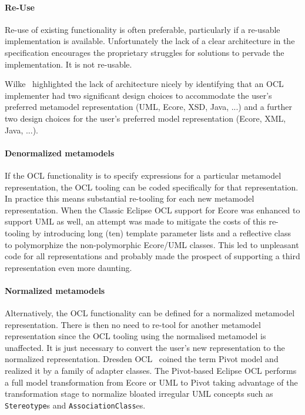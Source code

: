 \documentclass{jot}
\begin{document}
\paragraph{Re-Use} Re-use of existing functionality is often preferable, particularly if a re-usable implementation is available. Unfortunately the lack of a clear architecture in the specification encourages the proprietary struggles for solutions to pervade the implementation. It is not re-usable.

Wilke~\cite{Wilke-Variability} highlighted the lack of architecture nicely by identifying that an OCL implementer had two significant design choices to accommodate the user's preferred metamodel representation (UML, Ecore, XSD, Java, ...) and a further two design choices for the user's preferred model representation (Ecore, XML, Java, ...).

\paragraph{Denormalized metamodels} If the OCL functionality is to specify expressions for a particular metamodel representation, the OCL tooling can be coded specifically for that representation. In practice this means substantial re-tooling for each new metamodel representation. When the Classic Eclipse OCL support for Ecore was enhanced to support UML as well, an attempt was made to mitigate the costs of this re-tooling by introducing long (ten) template parameter lists and a reflective class to polymorphize the non-polymorphic Ecore/UML classes. This led to unpleasant code for all representations and probably made the prospect of supporting a third representation even more daunting.

\paragraph{Normalized metamodels} Alternatively, the OCL functionality can be defined for a normalized metamodel representation. There is then no need to re-tool for another metamodel representation since the OCL tooling using the normalised metamodel is unaffected. It is just necessary to convert the user's new representation to the normalized representation. Dresden OCL~\cite{Dresden-OCL} coined the term Pivot model and realized it by a family of adapter classes. The Pivot-based Eclipse OCL performs a full model transformation from Ecore or UML to Pivot taking advantage of the transformation stage to normalize bloated irregular UML concepts such as \verb$Stereotype$s and \verb$AssociationClass$es.
\end{document}
